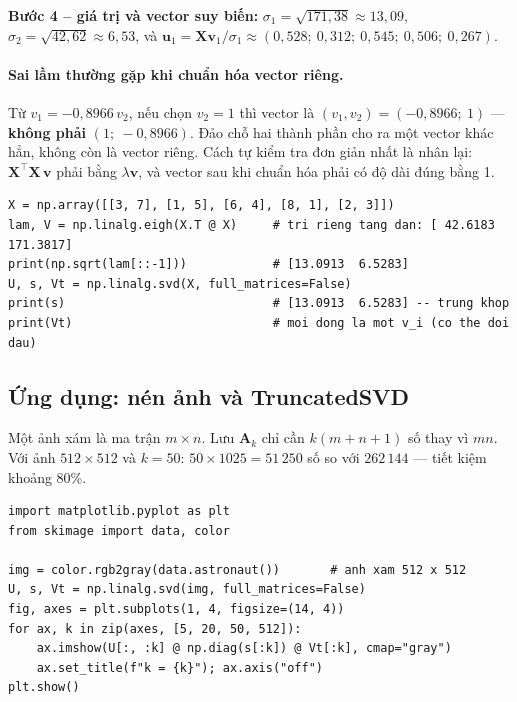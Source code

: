 \noindent\textbf{Bước 4 -- giá trị và vector suy biến:} $\sigma_1 = \sqrt{171{,}38} \approx 13{,}09$, $\sigma_2 = \sqrt{42{,}62} \approx 6{,}53$, và $\mathbf{u}_1 = \mathbf{X}\mathbf{v}_1/\sigma_1 \approx (0{,}528;\ 0{,}312;\ 0{,}545;\ 0{,}506;\ 0{,}267)$.

\paragraph{Sai lầm thường gặp khi chuẩn hóa vector riêng.} Từ $v_1 = -0{,}8966\,v_2$, nếu chọn $v_2 = 1$ thì vector là $(v_1, v_2) = (-0{,}8966;\ 1)$ --- \textbf{không phải} $(1;\ -0{,}8966)$. Đảo chỗ hai thành phần cho ra một vector khác hẳn, không còn là vector riêng. Cách tự kiểm tra đơn giản nhất là nhân lại: $\mathbf{X}^\top\mathbf{X}\,\mathbf{v}$ phải bằng $\lambda\mathbf{v}$, và vector sau khi chuẩn hóa phải có độ dài đúng bằng 1.

\begin{lstlisting}[caption={Kiểm tra cách tính SVD qua trị riêng}]
X = np.array([[3, 7], [1, 5], [6, 4], [8, 1], [2, 3]])
lam, V = np.linalg.eigh(X.T @ X)     # tri rieng tang dan: [ 42.6183 171.3817]
print(np.sqrt(lam[::-1]))            # [13.0913  6.5283]
U, s, Vt = np.linalg.svd(X, full_matrices=False)
print(s)                             # [13.0913  6.5283] -- trung khop
print(Vt)                            # moi dong la mot v_i (co the doi dau)
\end{lstlisting}

\subsection{Ứng dụng: nén ảnh và TruncatedSVD}

Một ảnh xám là ma trận $m \times n$. Lưu $\mathbf{A}_k$ chỉ cần $k(m + n + 1)$ số thay vì $mn$. Với ảnh $512 \times 512$ và $k = 50$: $50 \times 1025 = 51\,250$ số so với $262\,144$ --- tiết kiệm khoảng 80\%.

\begin{lstlisting}[caption={Nén ảnh bằng SVD}]
import matplotlib.pyplot as plt
from skimage import data, color

img = color.rgb2gray(data.astronaut())       # anh xam 512 x 512
U, s, Vt = np.linalg.svd(img, full_matrices=False)
fig, axes = plt.subplots(1, 4, figsize=(14, 4))
for ax, k in zip(axes, [5, 20, 50, 512]):
    ax.imshow(U[:, :k] @ np.diag(s[:k]) @ Vt[:k], cmap="gray")
    ax.set_title(f"k = {k}"); ax.axis("off")
plt.show()
\end{lstlisting}

